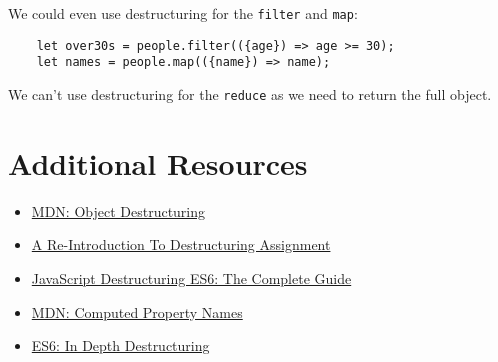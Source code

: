 We could even use destructuring for the \texttt{filter} and \texttt{map}:

\begin{verbatim}
    let over30s = people.filter(({age}) => age >= 30);
    let names = people.map(({name}) => name);
\end{verbatim}

We can't use destructuring for the \texttt{reduce} as we need to return the full object.

\section{Additional Resources}

\begin{itemize}[leftmargin=*]
    \item \href{https://developer.mozilla.org/en-US/docs/Web/JavaScript/Reference/Operators/Destructuring_assignment}{MDN: Object Destructuring}
    \item \href{https://www.smashingmagazine.com/2019/09/reintroduction-destructuring-assignment/}{A Re-Introduction To Destructuring Assignment}
    \item \href{https://buginit.com/javascript/javascript-destructuring-es6-the-complete-guide/}{JavaScript Destructuring ES6: The Complete Guide}
    \item \href{https://developer.mozilla.org/en-US/docs/Web/JavaScript/Reference/Operators/Object_initializer#Computed_property_names}{MDN: Computed Property Names}
    \item \href{https://hacks.mozilla.org/2015/05/es6-in-depth-destructuring/}{ES6: In Depth Destructuring}
\end{itemize}
